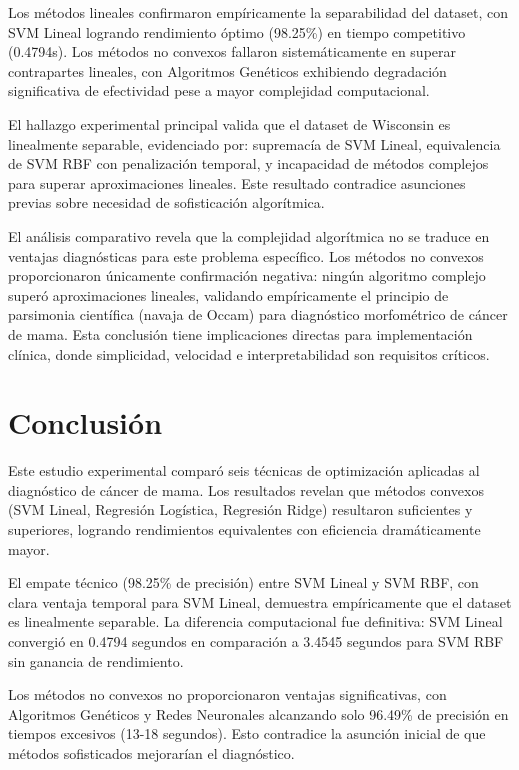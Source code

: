 \documentclass[conference]{IEEEtran}
\begin{document}
Los métodos lineales confirmaron empíricamente la separabilidad del dataset, con SVM Lineal logrando rendimiento óptimo (98.25\%) en tiempo competitivo (0.4794s). Los métodos no convexos fallaron sistemáticamente en superar contrapartes lineales, con Algoritmos Genéticos exhibiendo degradación significativa de efectividad pese a mayor complejidad computacional.

El hallazgo experimental principal valida que el dataset de Wisconsin es linealmente separable, evidenciado por: supremacía de SVM Lineal, equivalencia de SVM RBF con penalización temporal, y incapacidad de métodos complejos para superar aproximaciones lineales. Este resultado contradice asunciones previas sobre necesidad de sofisticación algorítmica.

El análisis comparativo revela que la complejidad algorítmica no se traduce en ventajas diagnósticas para este problema específico. Los métodos no convexos proporcionaron únicamente confirmación negativa: ningún algoritmo complejo superó aproximaciones lineales, validando empíricamente el principio de parsimonia científica (navaja de Occam) para diagnóstico morfométrico de cáncer de mama. Esta conclusión tiene implicaciones directas para implementación clínica, donde simplicidad, velocidad e interpretabilidad son requisitos críticos.

\section{Conclusión}

Este estudio experimental comparó seis técnicas de optimización aplicadas al diagnóstico de cáncer de mama. Los resultados revelan que métodos convexos (SVM Lineal, Regresión Logística, Regresión Ridge) resultaron suficientes y superiores, logrando rendimientos equivalentes con eficiencia dramáticamente mayor.

El empate técnico (98.25\% de precisión) entre SVM Lineal y SVM RBF, con clara ventaja temporal para SVM Lineal, demuestra empíricamente que el dataset es linealmente separable. La diferencia computacional fue definitiva: SVM Lineal convergió en 0.4794 segundos en comparación a 3.4545 segundos para SVM RBF sin ganancia de rendimiento.

Los métodos no convexos no proporcionaron ventajas significativas, con Algoritmos Genéticos y Redes Neuronales alcanzando solo 96.49\% de precisión en tiempos excesivos (13-18 segundos). Esto contradice la asunción inicial de que métodos sofisticados mejorarían el diagnóstico.
\end{document}
